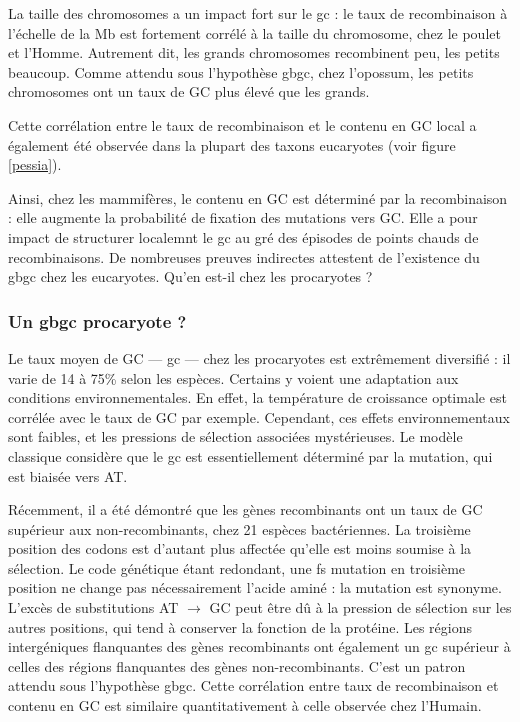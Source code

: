 \documentclass[11pt, oneside]{scrartcl}
\begin{document}
La taille des chromosomes a un impact fort sur le \ac{gc} : le taux de
recombinaison à l'échelle de la Mb est fortement corrélé à la taille du
chromosome, chez le poulet et l'Homme\cite{kaback_chromosome_1999}. Autrement
dit, les grands chromosomes recombinent peu, les petits beaucoup. Comme attendu
sous l'hypothèse \ac{gbgc}, chez l'opossum, les petits chromosomes ont un taux
de GC plus élevé que les grands.

Cette corrélation entre le taux de recombinaison et le contenu en GC local a
également été observée dans la plupart des taxons eucaryotes (voir figure
\ref{pessia}). 

\begin{transition}
  Ainsi, chez les mammifères, le contenu en GC est déterminé par la
  recombinaison : elle augmente la probabilité de fixation des mutations vers
  GC. Elle a pour impact de structurer localemnt le \ac{gc} au gré des épisodes
  de points chauds de recombinaisons. De nombreuses preuves indirectes attestent
  de l'existence du \ac{gbgc} chez les eucaryotes. Qu'en est-il chez les
  procaryotes ?
\end{transition}

\subsubsection{Un \ac{gbgc} procaryote ?}
\label{sec:orgheadline13}
Le taux moyen de GC --- \ac{gc} --- chez les procaryotes est extrêmement
diversifié : il varie de 14 à 75\% selon les espèces. Certains y voient une
adaptation aux conditions environnementales. En effet, la température de
croissance optimale est corrélée avec le taux de GC par exemple. Cependant, ces
effets environnementaux sont faibles, et les pressions de sélection associées
mystérieuses. Le modèle classique considère que le \ac{gc} est essentiellement
déterminé par la mutation, qui est biaisée vers
AT\cite{hershberg_evidence_2010,sueoka_directional_1988}.

Récemment, il a été démontré que les gènes recombinants ont un taux de GC
supérieur aux non-recombinants\cite{lassalle_gc-content_2015}, chez 21 espèces
bactériennes. La troisième position des codons est d'autant plus affectée
qu'elle est moins soumise à la sélection. Le code génétique étant redondant, une fs
mutation en troisième position ne change pas nécessairement l'acide aminé : la
mutation est synonyme. L'excès de substitutions AT \(\rightarrow\) GC peut être dû
à la pression de sélection sur les autres positions, qui tend à conserver la
fonction de la protéine. Les régions intergéniques flanquantes des gènes
recombinants ont également un \ac{gc} supérieur à celles des régions flanquantes
des gènes non-recombinants. C'est un patron attendu sous l'hypothèse \ac{gbgc}.
Cette corrélation entre taux de recombinaison et contenu en GC est similaire
quantitativement à celle observée chez l'Humain\cite{lassalle_gc-content_2015}.
\end{document}
